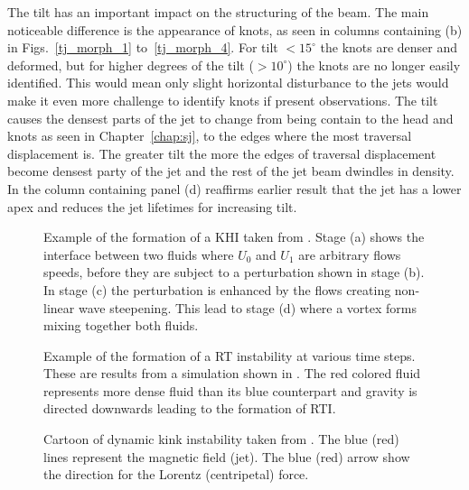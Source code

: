 \documentclass[12pt]{ociamthesis}
\newcommand{\mfig}[4]{
  \begin{figure}
  \begin{center}
  \texttt{[image: \#2]}
  \caption{#3}
  \label{#4}
  \end{center}
  \end{figure}}
\newcommand{\degs}{^{\circ}}
\begin{document}
The tilt has an important impact on the structuring of the beam. The main noticeable difference is the appearance of knots, as seen in columns containing (b) in Figs.~\ref{tj_morph_1} to~\ref{tj_morph_4}. For tilt $<15\degs$ the knots are denser and deformed, but for higher degrees of the tilt ($> 10^{\circ}$) the knots are no longer easily identified. This would mean only slight horizontal disturbance to the jets would make it even more challenge to identify knots if present observations. The tilt causes the densest parts of the jet to change from being contain to the head and knots as seen in Chapter~\ref{chap:sj}, to the edges where the most traversal displacement is. The greater tilt the more the edges of traversal displacement become densest party of the jet and the rest of the jet beam dwindles in density. In the column containing panel (d) reaffirms earlier result that the jet has a lower apex and reduces the jet lifetimes for increasing tilt.
%
\begin{figure}
\captionsetup[subfigure]{labelformat=empty}
\centering
{}
\caption{Example of the formation of a KHI taken from \cite{Barbulescu2018SoPh29386B}. Stage (a) shows the interface between two fluids where $U_0$ and $U_1$ are arbitrary flows speeds, before they are subject to a perturbation shown in stage (b). In stage (c) the perturbation is enhanced by the flows creating non-linear wave steepening. This lead to stage (d) where a vortex forms mixing together both fluids. }
\label{KHI_example}
\end{figure}
\begin{figure}
\captionsetup[subfigure]{labelformat=empty}
\centering
{}
\caption{Example of the formation of a RT instability at various time steps. These are results from a simulation shown in \cite{Liang2019PhFl31k2104L}. The red colored fluid represents more dense fluid than its blue counterpart and gravity is directed downwards leading to the formation of RTI.}
\label{RT_example}
\end{figure}
\begin{figure}
\captionsetup[subfigure]{labelformat=empty}
\centering
{}
\caption{Cartoon of dynamic kink instability taken from \cite{Zaqarashvili2020ApJ893L46Z}. The blue (red) lines represent the magnetic field (jet). The blue (red) arrow show the direction for the Lorentz (centripetal) force.}
\label{DKI_example}
\end{figure}
\end{document}
